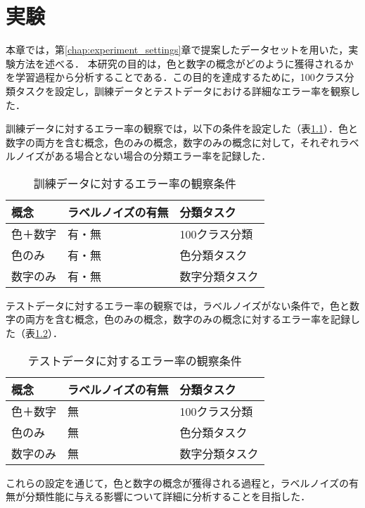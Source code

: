 \chapter{実験}
\label{chap:experiment}

本章では，第\ref{chap:experiment_settings}章で提案したデータセットを用いた，実験方法を述べる．
本研究の目的は，色と数字の概念がどのように獲得されるかを学習過程から分析することである．この目的を達成するために，100クラス分類タスクを設定し，訓練データとテストデータにおける詳細なエラー率を観察した．

訓練データに対するエラー率の観察では，以下の条件を設定した（表\ref{tab:train_error}）．色と数字の両方を含む概念，色のみの概念，数字のみの概念に対して，それぞれラベルノイズがある場合とない場合の分類エラー率を記録した．

\begin{table}[h]
\centering
\caption{訓練データに対するエラー率の観察条件}
\begin{tabular}{lll}
\toprule
\textbf{概念} & \textbf{ラベルノイズの有無} & \textbf{分類タスク} \\
\midrule
色＋数字 & 有・無 & 100クラス分類 \\
色のみ   & 有・無 & 色分類タスク \\
数字のみ & 有・無 & 数字分類タスク \\
\bottomrule
\end{tabular}
\label{tab:train_error}
\end{table}

テストデータに対するエラー率の観察では，ラベルノイズがない条件で，色と数字の両方を含む概念，色のみの概念，数字のみの概念に対するエラー率を記録した（表\ref{tab:test_error}）．

\begin{table}[h]
\centering
\caption{テストデータに対するエラー率の観察条件}
\begin{tabular}{lll}
\toprule
\textbf{概念} & \textbf{ラベルノイズの有無} & \textbf{分類タスク} \\
\midrule
色＋数字 & 無 & 100クラス分類 \\
色のみ   & 無 & 色分類タスク \\
数字のみ & 無 & 数字分類タスク \\
\bottomrule
\end{tabular}
\label{tab:test_error}
\end{table}

これらの設定を通じて，色と数字の概念が獲得される過程と，ラベルノイズの有無が分類性能に与える影響について詳細に分析することを目指した．

